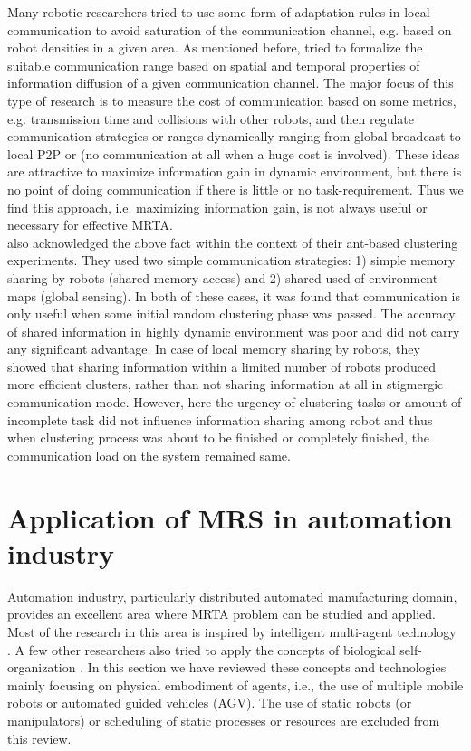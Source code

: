 Many robotic researchers tried to use some form of adaptation rules in local communication to avoid saturation of the communication channel, e.g. based on robot densities in a given area.  As mentioned before,   tried to formalize the suitable communication range based on spatial and temporal properties of information diffusion of a given communication channel. The major focus of this type of research is to measure the cost of communication based on some metrics, e.g.  transmission time and collisions with other robots, and then regulate communication strategies or ranges dynamically ranging from global broadcast to local P2P or (no communication at all when a huge cost is involved). These ideas are attractive to maximize information gain in dynamic environment, but there is no point of doing communication if there is little or no task-requirement. Thus we find this approach, i.e. maximizing information gain,  is not always useful or necessary for effective MRTA.\\
\cite{Oca+2005} also acknowledged the above fact within the context of their ant-based clustering experiments. They used two simple communication strategies: 1) simple memory sharing by robots (shared memory access) and 2) shared used of environment maps (global sensing). In both of these cases, it was found that communication is only useful when some initial random clustering phase was passed. The accuracy of shared information in highly dynamic environment was poor and did not carry any significant advantage. In case of local memory sharing by robots, they showed that  sharing information within a limited number of robots produced more efficient  clusters, rather than  not sharing information at all in stigmergic communication mode. However, here the urgency of clustering tasks or amount of incomplete task did not influence information sharing among robot and thus when clustering process was about to be finished or completely finished, the communication load on the system remained same.
\section{Application of MRS in automation industry}
\label{bg:mrs-industry}
Automation industry, particularly distributed automated manufacturing domain, provides an excellent area where MRTA problem can be studied and applied. Most of the research in this area is inspired by intelligent multi-agent technology \cite{Shen+2001}. A few other researchers also tried to apply the concepts of biological self-organization \cite{Ueda2006,Lazinica+2007}. In this section we have reviewed these concepts and technologies mainly focusing on physical embodiment of agents, i.e., the use of multiple mobile robots or automated guided vehicles (AGV). The use of static robots (or manipulators) or scheduling of static processes or resources are excluded from this review.
%
